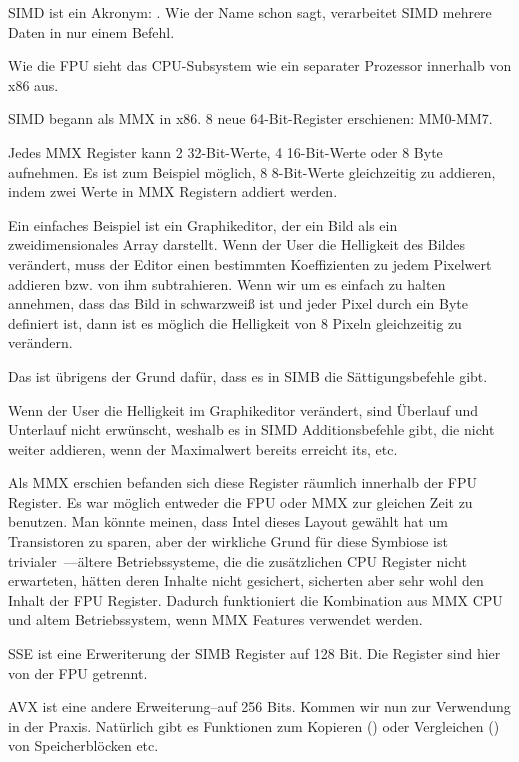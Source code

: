 
\label{SIMD_x86}
\ac{SIMD} ist ein Akronym: .
Wie der Name schon sagt, verarbeitet SIMD mehrere Daten in nur einem Befehl.

Wie die \ac{FPU} sieht das \ac{CPU}-Subsystem wie ein separater Prozessor innerhalb von x86 aus.


SIMD begann als MMX in x86. 8 neue 64-Bit-Register erschienen: MM0-MM7.

Jedes MMX Register kann 2 32-Bit-Werte, 4 16-Bit-Werte oder 8 Byte aufnehmen.
Es ist zum Beispiel möglich, 8 8-Bit-Werte gleichzeitig zu addieren, indem zwei Werte in MMX Registern addiert werden.

Ein einfaches Beispiel ist ein Graphikeditor, der ein Bild als ein zweidimensionales Array darstellt.
Wenn der User die Helligkeit des Bildes verändert, muss der Editor einen bestimmten Koeffizienten zu jedem Pixelwert
addieren bzw. von ihm subtrahieren.
Wenn wir um es einfach zu halten annehmen, dass das Bild in schwarzweiß ist und jeder Pixel durch ein Byte definiert
ist, dann ist es möglich die Helligkeit von 8 Pixeln gleichzeitig zu verändern.

Das ist übrigens der Grund dafür, dass es in SIMB die Sättigungsbefehle gibt.

Wenn der User die Helligkeit im Graphikeditor verändert, sind Überlauf und Unterlauf nicht erwünscht, weshalb es in SIMD
Additionsbefehle gibt, die nicht weiter addieren, wenn der Maximalwert bereits erreicht its, etc.

Als MMX erschien befanden sich diese Register räumlich innerhalb der FPU Register.
Es war möglich entweder die FPU oder MMX zur gleichen Zeit zu benutzen. Man könnte meinen, dass Intel dieses Layout
gewählt hat um Transistoren zu sparen, aber der wirkliche Grund für diese Symbiose ist trivialer~---ältere
Betriebssysteme, die die zusätzlichen CPU Register nicht erwarteten, hätten deren Inhalte nicht gesichert, sicherten
aber sehr wohl den Inhalt der FPU Register.
Dadurch funktioniert die Kombination aus MMX CPU und altem Betriebssystem, wenn MMX Features verwendet werden. 

SSE ist eine Erweriterung der SIMB Register auf 128 Bit. Die Register sind hier von der FPU getrennt.

AVX ist eine andere Erweiterung--auf 256 Bits.
Kommen wir nun zur Verwendung in der Praxis.
Natürlich gibt es Funktionen zum Kopieren () oder Vergleichen () von Speicherblöcken etc.

